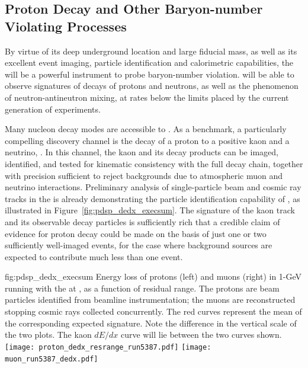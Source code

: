 \clearpage
\subsection{Proton Decay and Other 
Baryon-number Violating Processes}
\label{sec:es:phys:pdecay}

By virtue of its deep underground location and large fiducial 
mass, as well as its excellent event imaging, particle 
identification and 
calorimetric capabilities, the   will be 
a powerful instrument %
to probe baryon-number violation.
 will be able to observe signatures of decays of protons and 
neutrons, as well as the phenomenon of neutron-antineutron mixing, 
at rates below the limits placed by the current generation of 
experiments.

Many nucleon decay modes are accessible to .  
As a benchmark, a particularly compelling discovery channel 
is the decay of a proton to a positive kaon and a neutrino, 
\ptoknubar.  In this channel, the kaon and its decay products 
can be imaged, identified, and tested for kinematic consistency 
with the full decay chain, together with precision sufficient to 
reject backgrounds due to atmospheric muon and neutrino 
interactions. 
Preliminary analysis of single-particle beam and cosmic ray tracks 
in the   is already demonstrating the particle 
identification capability of , as illustrated in 
Figure~\ref{fig:pdsp_dedx_execsum}.  
The signature of the kaon track and its observable decay particles is 
sufficiently rich that a credible claim of evidence for 
proton decay could be made on the basis of just 
one or two sufficiently well-imaged events, for the case 
where background sources are expected to contribute much less 
than one event.

\begin{dunefigure}{fig:pdsp_dedx_execsum}
{Energy loss of protons (left) and muons (right) in 1-GeV  
running with the   at , as a function of 
residual range.  The protons are beam particles identified from 
beamline instrumentation; the muons are reconstructed stopping 
cosmic rays collected concurrently.  
The red curves represent the mean of the 
corresponding expected signature.  Note the difference in 
the vertical scale of the two plots.  The kaon $dE/dx$ curve 
will lie between the two curves shown.}
\texttt{[image: proton\_dedx\_resrange\_run5387.pdf]}\hspace{0.05\linewidth}
\texttt{[image: muon\_run5387\_dedx.pdf]}
\end{dunefigure}

